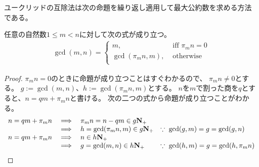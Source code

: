 	ユークリッドの互除法は次の命題を繰り返し適用して最大公約数を求める方法
	である。

	\begin{proposition}[ユークリッドの互除法]
	\label{prop:ユークリッドの互除法} %
		任意の自然数$1\le m<n$に対して次の式が成り立つ。
		\begin{equation*}\begin{split}
			\gcd(m,n) = \begin{cases}
				m, &\text{ iff } \pi_mn = 0 \\
				\gcd(\pi_mn,m), &\text{ otherwise } \\
			\end{cases}
		\end{split}\end{equation*}
	\end{proposition} %
	\begin{proof} $\pi_mn=0$のときに命題が成り立つことはすぐわかるので、
	$\pi_mn\neq0$とする。
	$g:=\gcd(m,n)$、$h:=\gcd(\pi_mn,m)$とする。
	$n$を$m$で割った商を$q$とすると、$n=qm+\pi_mn$と書ける。
	次の二つの式から命題が成り立つことがわかる。
	{\setlength\arraycolsep{2pt}
	\begin{equation*}\begin{array}{rcll}
		n=qm+\pi_mn &\implies& \pi_mn = n-qm\in g\mathbf{N}_+ \\
		&\implies& h = \gcd(\pi_mn,m) \in g\mathbf{N}_+ 
			& \because\; \gcd(g,m)=g=\gcd(g,n) \\
		n=qm+\pi_mn &\implies& n\in h\mathbf{N}_+ \\
		&\implies& g = \gcd(m,n) \in h\mathbf{N}_+
			& \because\; \gcd(h,m)=g=\gcd(h,\pi_mn) \\
	\end{array}\end{equation*}
	}
	\end{proof}


